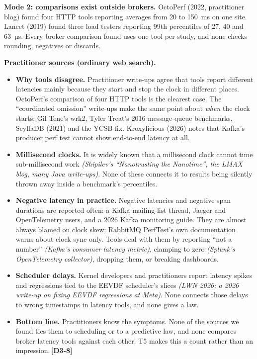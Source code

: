 \documentclass[11pt]{article}
\newcommand{\gl}[1]{{\color{soft}\itshape\small (#1)}}
\newcommand{\chgold}[1]{\,{\color{oldcol}\bfseries\footnotesize[#1]}}
\begin{document}
\textbf{Mode 2: comparisons exist outside brokers.} OctoPerf (2022, practitioner blog) found four HTTP tools reporting averages from 20 to 150~ms on one site. Lancet (2019) found three load testers reporting 99th percentiles of 27, 40 and 63~µs. Every broker comparison found uses one tool per study, and none checks rounding, negatives or discards.

\textbf{Practitioner sources (ordinary web search).}
\begin{itemize}
  \item \textbf{Why tools disagree.} Practitioner write-ups agree that tools report different latencies mainly because they start and stop the clock in different places. OctoPerf's comparison of four HTTP tools is the clearest case. The ``coordinated omission'' write-ups make the same point about \emph{when} the clock starts: Gil Tene's wrk2, Tyler Treat's 2016 message-queue benchmarks, ScyllaDB (2021) and the YCSB fix. Kroxylicious (2026) notes that Kafka's producer perf test cannot show end-to-end latency at all.
  \item \textbf{Millisecond clocks.} It is widely known that a millisecond clock cannot time sub-millisecond work \gl{Shipilev's ``Nanotrusting the Nanotime'', the LMAX blog, many Java write-ups}. None of these connects it to results being silently thrown away inside a benchmark's percentiles.
  \item \textbf{Negative latency in practice.} Negative latencies and negative span durations are reported often: a Kafka mailing-list thread, Jaeger and OpenTelemetry users, and a 2026 Kafka monitoring guide. They are almost always blamed on clock skew; RabbitMQ PerfTest's own documentation warns about clock sync only. Tools deal with them by reporting ``not a number'' \gl{Kafka's consumer latency metric}, clamping to zero \gl{Splunk's OpenTelemetry collector}, dropping them, or breaking dashboards.
  \item \textbf{Scheduler delays.} Kernel developers and practitioners report latency spikes and regressions tied to the EEVDF scheduler's slices \gl{LWN 2026; a 2026 write-up on fixing EEVDF regressions at Meta}. None connects those delays to wrong timestamps in latency tools, and none gives a law.
  \item \textbf{Bottom line.} Practitioners know the symptoms. None of the sources we found ties them to scheduling or to a predictive law, and none compares broker latency tools against each other. T5 makes this a count rather than an impression.\chgold{D3-8}
\end{itemize}
\end{document}
